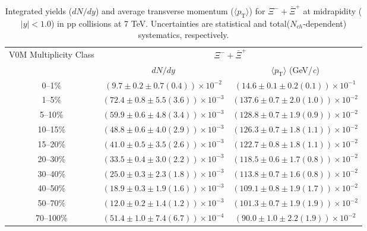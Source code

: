 \begin{table}
\caption{Integrated yields ($dN/dy$) and average transverse momentum ($\langle p_{\mathrm{T}} \rangle$) for $\Xi^{-} + \bar{\Xi}^{+}$ at midrapidity ($|y|<1.0$) in pp collisions at 7 TeV. Uncertainties are statistical and total($N_{ch}$-dependent) systematics, respectively.}
\label{tab:YieldMeanXiSum_}
\begin{center}
\begin{tabular}{ c | c c }
\hline
\multirow{2}{*}{V0M Multiplicity Class} & \multicolumn{2}{c}{$\Xi^{-} + \bar{\Xi}^{+}$} \\ 
& $dN/dy$ & $\langle p_{\mathrm{T}} \rangle$ (GeV/\textit{c})\\ 
\hline
0--1\% & $(9.7\pm0.2\pm0.7(0.4))\times10^{-2}$ & $(14.6\pm0.1\pm0.2(0.1))\times10^{-1}$ \\ 
1--5\% & $(72.4\pm0.8\pm5.5(3.6))\times10^{-3}$ & $(137.6\pm0.7\pm2.0(1.0))\times10^{-2}$ \\ 
5--10\% & $(59.9\pm0.6\pm4.8(3.4))\times10^{-3}$ & $(128.8\pm0.7\pm1.9(0.9))\times10^{-2}$ \\ 
10--15\% & $(48.8\pm0.6\pm4.0(2.9))\times10^{-3}$ & $(126.3\pm0.7\pm1.8(1.1))\times10^{-2}$ \\ 
15--20\% & $(41.0\pm0.5\pm3.5(2.6))\times10^{-3}$ & $(122.7\pm0.8\pm1.8(1.1))\times10^{-2}$ \\ 
20--30\% & $(33.5\pm0.4\pm3.0(2.2))\times10^{-3}$ & $(118.5\pm0.6\pm1.7(0.8))\times10^{-2}$ \\ 
30--40\% & $(25.0\pm0.3\pm2.3(1.8))\times10^{-3}$ & $(113.8\pm0.7\pm1.6(0.8))\times10^{-2}$ \\ 
40--50\% & $(18.9\pm0.3\pm1.9(1.6))\times10^{-3}$ & $(109.1\pm0.8\pm1.9(1.7))\times10^{-2}$ \\ 
50--70\% & $(12.0\pm0.2\pm1.4(1.2))\times10^{-3}$ & $(101.3\pm0.7\pm1.9(1.9))\times10^{-2}$ \\ 
70--100\% & $(51.4\pm1.0\pm7.4(6.7))\times10^{-4}$ & $(90.0\pm1.0\pm2.2(1.9))\times10^{-2}$ \\ 
\hline
\end{tabular}
\end{center}
\end{table}
 
